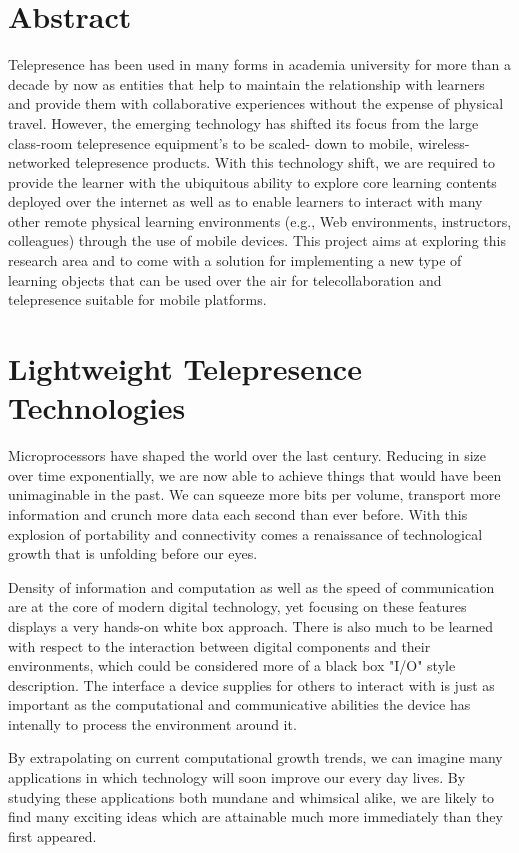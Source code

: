 \documentclass[a4paper,12pt]{report}
\begin{document}
\chapter*{\centering Abstract}
Telepresence has been used in many forms in academia university for more than a decade by now as entities that help to maintain the relationship with learners and provide them with collaborative experiences without the expense of physical travel. However, the emerging technology has shifted its focus from the large class-room telepresence equipment’s to be scaled- down to mobile, wireless-networked telepresence products. With this technology shift, we are required to provide the learner with the ubiquitous ability to explore core learning contents deployed over the internet as well as to enable learners to interact with many other remote physical learning environments (e.g., Web environments, instructors, colleagues) through the use of mobile devices. This project aims at exploring this research area and to come with a solution for implementing a new type of learning objects that can be used over the air for telecollaboration and telepresence suitable for mobile platforms. 

\chapter{Lightweight Telepresence Technologies}

Microprocessors have shaped the world over the last century. Reducing in size over time exponentially, we are now able to achieve things that would have been unimaginable in the past. We can squeeze more bits per volume, transport more information and crunch more data each second than ever before. With this explosion of portability and connectivity comes a renaissance of technological growth that is unfolding before our eyes.

Density of information and computation as well as the speed of communication are at the core of modern digital technology, yet focusing on these features displays a very hands-on white box approach. There is also much to be learned with respect to the interaction between digital components and their environments, which could be considered more of a black box "I/O" style description. The interface a device supplies for others to interact with is just as important as the computational and communicative abilities the device has intenally to process the environment around it.

By extrapolating on current computational growth trends, we can imagine many applications in which technology will soon improve our every day lives. By studying these applications both mundane and whimsical alike, we are likely to find many exciting ideas which are attainable much more immediately than they first appeared.
\end{document}
